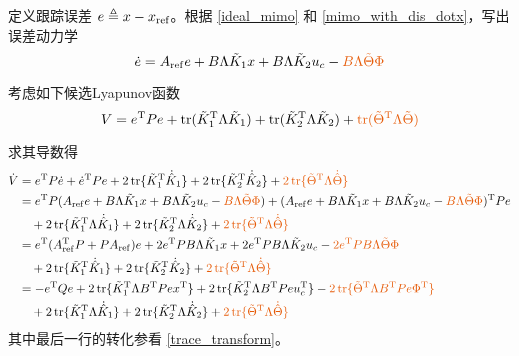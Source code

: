 定义跟踪误差 $e \triangleq x - x_{\operatorname{ref}}$。根据 \eqref{ideal_mimo} 和 \eqref{mimo_with_dis_dotx}，写出误差动力学
\begin{equation}
  \dot{e} = A_{\refval} e + B \Lambda  \tilde{K}_1 x +
  B \Lambda  \tilde{K}_2 u_c-\textcolor{second}{B\Lambda \tilde{\Theta}\Phi} \label{errsys_with_dis:MRAC:GLS}
\end{equation}

考虑如下候选Lyapunov函数
\begin{equation}
  V=e^\mathrm{T}Pe+\tr(\tilde{K}_1^\mathrm{T}{\Lambda}\tilde{K}_1)+\tr(\tilde{K}_2^\mathrm{T}{\Lambda}\tilde{K}_2)+\textcolor{second}{\tr (\tilde{\Theta}^\mathrm{T}{\Lambda}\tilde{\Theta})}
\end{equation}

求其导数得
\begin{align}
  \dot{V} & =e^\mathrm{T}P\dot{e}+\dot{e}^\mathrm{T}Pe + 2\tr \{
  \tilde{K}^\mathrm{T}_1 \dot{\hat{K}} _1 \} + 2\tr
  \{ \tilde{K}^\mathrm{T}_2 \dot{\hat{K}} _2 \}+\textcolor{second}{2\tr \{ \tilde{\Theta}^\mathrm{T} \Lambda\dot{\hat{\Theta}} \}}\nonumber\\
  & = e^\mathrm{T}P( A_{\refval} e + B \Lambda  \tilde{K}_1 x +
  B \Lambda  \tilde{K}_2 u_c-\textcolor{second}{B\Lambda \tilde{\Theta}\Phi})+(A_{\refval} e + B \Lambda  \tilde{K}_1 x +
  B \Lambda  \tilde{K}_2 u_c-\textcolor{second}{B\Lambda \tilde{\Theta}\Phi})^\mathrm{T}Pe\nonumber\\
  &\quad+
  2\tr \{ \tilde{K}^\mathrm{T}_1 \Lambda\dot{\hat{K}} _1 \}
  + 2\tr \{ \tilde{K}^\mathrm{T}_2 \Lambda\dot{\hat{K}} _2 \}+\textcolor{second}{2\tr \{ \tilde{\Theta}^\mathrm{T} \Lambda\dot{\hat{\Theta}} \}}\nonumber\\
  &= e^\mathrm{T}(A_{\refval}^\mathrm{T} P + P A_{\refval}) e+ 2 e^\mathrm{T}  P  B \Lambda 
  \tilde{K}_1 x + 2 e^\mathrm{T} P  B \Lambda  \tilde{K}_2 u_c -\textcolor{second}{2 e^\mathrm{T}PB\Lambda \tilde{\Theta}\Phi}\nonumber\\
  &\quad +  2\tr \{ \tilde{K}^\mathrm{T}_1  \dot{\hat{K}} _1 \}
  + 2\tr \{ \tilde{K}^\mathrm{T}_2  \dot{\hat{K}} _2
  \}+\textcolor{second}{2\tr \{ \tilde{\Theta}^\mathrm{T} \Lambda\dot{\hat{\Theta}} \}}\nonumber\\
  & = -e^\mathrm{T}Q e +
  2\tr \{ \tilde{K}^\mathrm{T}_1 \Lambda B^\mathrm{T}  P  e  x^\mathrm{T} \} +
  2\tr \{ \tilde{K}^\mathrm{T}_2 \Lambda B^\mathrm{T}  P  e  u_c^\mathrm{T} \} - \textcolor{second}{2\tr \{ \tilde{\Theta}^\mathrm{T} \Lambda B^\mathrm{T}Pe\Phi^\mathrm{T}
  \}}\nonumber\\
  &\quad + 2\tr \{ \tilde{K}^\mathrm{T}_1  \Lambda\dot{\hat{K}} _1 \}
  + 2\tr \{ \tilde{K}^\mathrm{T}_2  \Lambda \dot{\hat{K}} _2\}+\textcolor{second}{2\tr \{ \tilde{\Theta}^\mathrm{T} \Lambda\dot{\hat{\Theta}} \}}\label{pro_dot_V_modify}
\end{align}
其中最后一行的转化参看 \eqref{trace_transform}。

